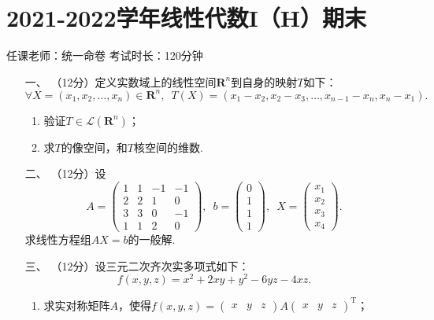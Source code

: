 \section*{2021-2022学年线性代数I（H）期末}

\begin{center}
    任课老师：统一命卷\hspace{4em} 考试时长：120分钟
\end{center}

\begin{enumerate}
	\item[一、]（12分）定义实数域上的线性空间$\mathbf{R}^n$到自身的映射$T$如下：
	\[\forall X=(x_1,x_2,\ldots,x_n)\in\mathbf{R}^n,\enspace T(X)=(x_1-x_2,x_2-x_3,\ldots,x_{n-1}-x_n,x_n-x_1).\]
    \begin{enumerate}[label=(\arabic*)]
        \item 验证$T\in\mathcal{L}(\mathbf{R}^n)$；

        \item 求$T$的像空间，和$T$核空间的维数.
    \end{enumerate}
	\item[二、]（12分）设
	\[A=\begin{pmatrix}
        1 & 1 & -1 & -1 \\ 2 & 2 & 1 & 0 \\ 3 & 3 & 0 & -1 \\ 1 & 1 & 2 & 0
    \end{pmatrix},\enspace b=\begin{pmatrix}
        0 \\ 1 \\ 1 \\ 1
    \end{pmatrix},\enspace X=\begin{pmatrix}
        x_1 \\ x_2 \\ x_3 \\ x_4
    \end{pmatrix}.\]
    求线性方程组$AX=b$的一般解.
	\item[三、]（12分）设三元二次齐次实多项式如下：
	\[f(x,y,z)=x^2+2xy+y^2-6yz-4xz.\]
    \begin{enumerate}[label=(\arabic*)]
        \item 求实对称矩阵$A$，使得$f(x,y,z)=\begin{pmatrix}
            x & y & z
        \end{pmatrix}A\begin{pmatrix}
            x & y & z
        \end{pmatrix}^\mathrm{T}$；


\end{enumerate}
\end{enumerate}
